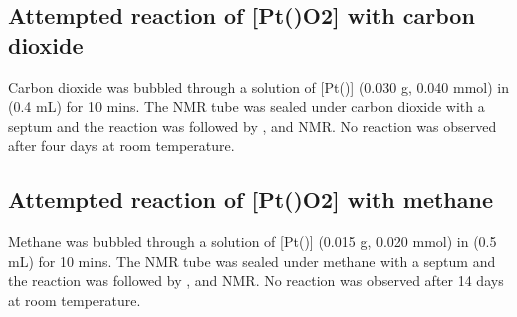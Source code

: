 

\subsection*{Attempted reaction of [Pt(\tButhixantphos)O2] with carbon dioxide}

Carbon dioxide was bubbled through a solution of [Pt(\tButhixantphos)] (0.030 g, 0.040 mmol) in  (0.4 mL) for 10 mins.  The NMR tube was sealed under carbon dioxide with a septum and the reaction was followed by \proton{}, \carbon{} and \phosphorus{} NMR.  No reaction was observed after four days at room temperature.  

\subsection*{Attempted reaction of [Pt(\tButhixantphos)O2] with methane}

Methane was bubbled through a solution of [Pt(\tButhixantphos)] (0.015 g, 0.020 mmol)  in  (0.5 mL) for 10 mins.  The NMR tube was sealed under methane with a septum and the reaction was followed by \proton{}, \carbon{} and \phosphorus{} NMR.  No reaction was observed after 14 days at room temperature.

